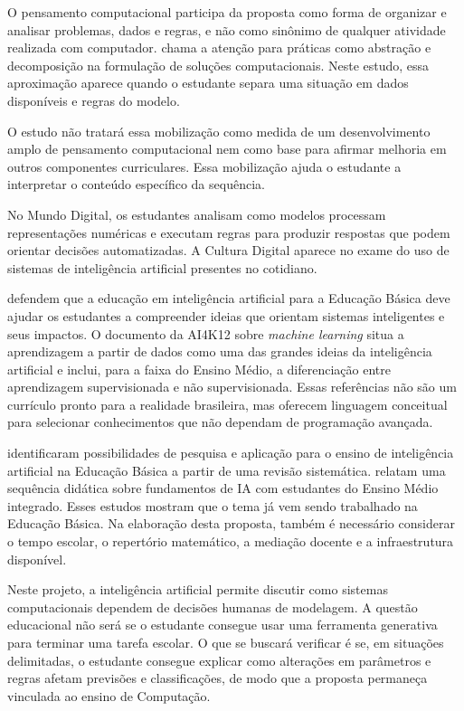 O pensamento computacional participa da proposta como forma de organizar e analisar problemas, dados e regras, e não como sinônimo de qualquer atividade realizada com computador.  chama a atenção para práticas como abstração e decomposição na formulação de soluções computacionais. Neste estudo, essa aproximação aparece quando o estudante separa uma situação em dados disponíveis e regras do modelo.

O estudo não tratará essa mobilização como medida de um desenvolvimento amplo de pensamento computacional nem como base para afirmar melhoria em outros componentes curriculares. Essa mobilização ajuda o estudante a interpretar o conteúdo específico da sequência.

No Mundo Digital, os estudantes analisam como modelos processam representações numéricas e executam regras para produzir respostas que podem orientar decisões automatizadas. A Cultura Digital aparece no exame do uso de sistemas de inteligência artificial presentes no cotidiano.

 defendem que a educação em inteligência artificial para a Educação Básica deve ajudar os estudantes a compreender ideias que orientam sistemas inteligentes e seus impactos. O documento da AI4K12 sobre \textit{machine learning} \cite{touretzky2023machine} situa a aprendizagem a partir de dados como uma das grandes ideias da inteligência artificial e inclui, para a faixa do Ensino Médio, a diferenciação entre aprendizagem supervisionada e não supervisionada. Essas referências não são um currículo pronto para a realidade brasileira, mas oferecem linguagem conceitual para selecionar conhecimentos que não dependam de programação avançada.

 identificaram possibilidades de pesquisa e aplicação para o ensino de inteligência artificial na Educação Básica a partir de uma revisão sistemática.  relatam uma sequência didática sobre fundamentos de IA com estudantes do Ensino Médio integrado. Esses estudos mostram que o tema já vem sendo trabalhado na Educação Básica. Na elaboração desta proposta, também é necessário considerar o tempo escolar, o repertório matemático, a mediação docente e a infraestrutura disponível.

Neste projeto, a inteligência artificial permite discutir como sistemas computacionais dependem de decisões humanas de modelagem. A questão educacional não será se o estudante consegue usar uma ferramenta generativa para terminar uma tarefa escolar. O que se buscará verificar é se, em situações delimitadas, o estudante consegue explicar como alterações em parâmetros e regras afetam previsões e classificações, de modo que a proposta permaneça vinculada ao ensino de Computação.

